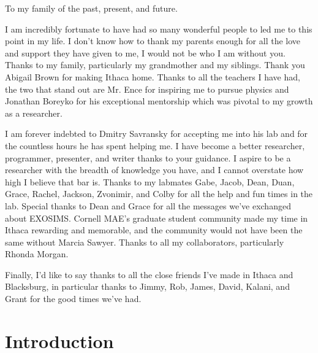 \documentclass[phd,tocprelim]{cornell}
\begin{document}
\begin{dedication}
To my family of the past, present, and future.
\end{dedication}

\begin{acknowledgements}

I am incredibly fortunate to have had so many wonderful people to led me to
this point in my life. I don't know how to thank my parents enough for all the
love and support they have given to me, I would not be who I am without you.
Thanks to my family, particularly my grandmother and my siblings. Thank you
Abigail Brown for making Ithaca home. Thanks to all the teachers I have had,
the two that stand out are Mr. Ence for inspiring me to pursue physics and
Jonathan Boreyko for his exceptional mentorship which was pivotal to my growth
as a researcher.

I am forever indebted to Dmitry Savransky for accepting me into his lab and for
the countless hours he has spent helping me. I have become a better researcher,
programmer, presenter, and writer thanks to your guidance. I aspire to be a
researcher with the breadth of knowledge you have, and I cannot overstate how
high I believe that bar is. Thanks to my labmates Gabe, Jacob, Dean, Duan,
Grace, Rachel, Jackson, Zvonimir, and Colby for all the help and fun times in
the lab. Special thanks to Dean and Grace for all the messages we've exchanged
about EXOSIMS. Cornell MAE's graduate student community made my time in Ithaca
rewarding and memorable, and the community would not have been the same without
Marcia Sawyer. Thanks to all my collaborators, particularly Rhonda Morgan.

Finally, I'd like to say thanks to all the close friends I've made in Ithaca
and Blacksburg, in particular thanks to Jimmy, Rob, James, David, Kalani, and
Grant for the good times we've had.


\end{acknowledgements}

\contentspage
\tablelistpage
\figurelistpage

\normalspacing \setcounter{page}{1} 
\pagestyle{cornell} \addtolength{\parskip}{0.5\baselineskip}

\chapter{Introduction}
\label{cha:intro}

\end{document}
